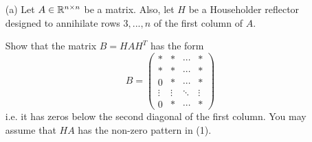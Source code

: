 \documentclass[10pt]{article}
\begin{document}
\begin{enumerate}

\item[(a)] Let $ A \in \mathbb{R}^{n \times n} $ be a matrix. Also, let $H$ be a Householder reflector designed to annihilate rows $ 3, ... , n $ of the first column of $A$. 

Show that the matrix $ B = HAH^T $ has the form \begin{equation}
B = \begin{pmatrix}
* & * & \cdots & * \\
* & * & \cdots & * \\
0 & * & \cdots & * \\
\vdots & \vdots & \ddots & \vdots \\
0 & * & \cdots & *
\end{pmatrix}
\end{equation} i.e. it has zeros below the second diagonal of the first column. You may assume that $HA$ has the non-zero pattern in (1).


\end{enumerate}
\end{document}
